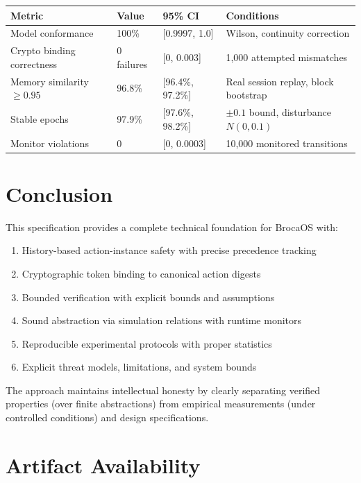 \documentclass[12pt]{article}
\begin{document}
\begin{center}
\small
\begin{tabular}{@{}p{}p{}p{}p{}@{}}
\toprule
\textbf{Metric} & \textbf{Value} & \textbf{95\% CI} & \textbf{Conditions} \\
\midrule
Model conformance & 100\% & [0.9997, 1.0] & Wilson, continuity correction \\
Crypto binding correctness & 0 failures & [0, 0.003] & 1,000 attempted mismatches \\
Memory similarity $\geq 0.95$ & 96.8\% & [96.4\%, 97.2\%] & Real session replay, block bootstrap \\
Stable epochs & 97.9\% & [97.6\%, 98.2\%] & $\pm0.1$ bound, disturbance $N(0,0.1)$ \\
Monitor violations & 0 & [0, 0.0003] & 10,000 monitored transitions \\
\bottomrule
\end{tabular}
\end{center}

\section{Conclusion}

This specification provides a complete technical foundation for BrocaOS with:
\begin{enumerate}
    \item History-based action-instance safety with precise precedence tracking
    \item Cryptographic token binding to canonical action digests
    \item Bounded verification with explicit bounds and assumptions
    \item Sound abstraction via simulation relations with runtime monitors
    \item Reproducible experimental protocols with proper statistics
    \item Explicit threat models, limitations, and system bounds
\end{enumerate}

The approach maintains intellectual honesty by clearly separating verified properties (over finite abstractions) from empirical measurements (under controlled conditions) and design specifications.

\section*{Artifact Availability}
\end{document}
